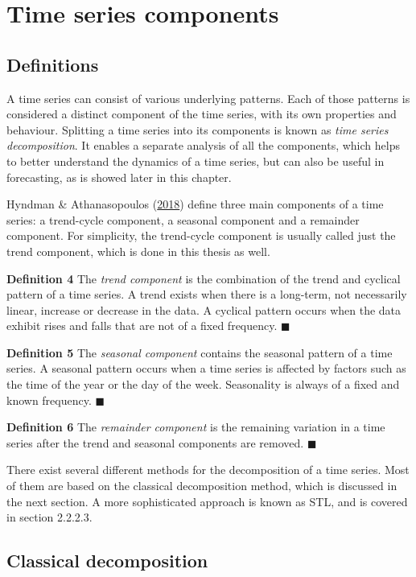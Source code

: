 \documentclass[12pt,oneside]{reedthesis}
\begin{document}
\section{Time series components}\label{time-series-components}

\subsection{Definitions}\label{definitions}

A time series can consist of various underlying patterns. Each of those
patterns is considered a distinct component of the time series, with its
own properties and behaviour. Splitting a time series into its
components is known as \emph{time series decomposition}. It enables a
separate analysis of all the components, which helps to better
understand the dynamics of a time series, but can also be useful in
forecasting, as is showed later in this chapter.

Hyndman \& Athanasopoulos (\protect\hyperlink{ref-hyndman2018fpp}{2018})
define three main components of a time series: a trend-cycle component,
a seasonal component and a remainder component. For simplicity, the
trend-cycle component is usually called just the trend component, which
is done in this thesis as well.

\textbf{Definition 4} The \emph{trend component} is the combination of
the trend and cyclical pattern of a time series. A trend exists when
there is a long-term, not necessarily linear, increase or decrease in
the data. A cyclical pattern occurs when the data exhibit rises and
falls that are not of a fixed frequency. \(\blacksquare\)

\textbf{Definition 5} The \emph{seasonal component} contains the
seasonal pattern of a time series. A seasonal pattern occurs when a time
series is affected by factors such as the time of the year or the day of
the week. Seasonality is always of a fixed and known frequency.
\(\blacksquare\)

\textbf{Definition 6} The \emph{remainder component} is the remaining
variation in a time series after the trend and seasonal components are
removed. \(\blacksquare\)

There exist several different methods for the decomposition of a time
series. Most of them are based on the classical decomposition method,
which is discussed in the next section. A more sophisticated approach is
known as STL, and is covered in section 2.2.2.3.

\subsection{Classical decomposition}\label{classical-decomposition}
\end{document}
